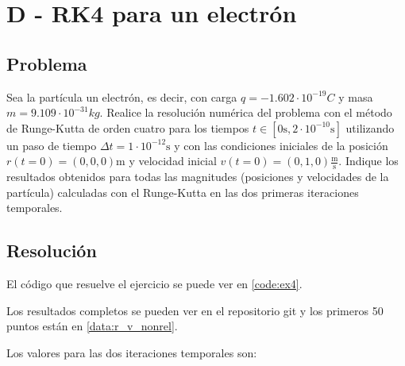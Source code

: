 \section{D - RK4 para un electrón}

\subsection{Problema}

Sea la partícula un electrón, es decir, con carga $q = -1.602 \cdot 10^{-19} C$  y masa $m = 9.109 \cdot 10^{-31} kg$. Realice la resolución numérica del problema con el método de Runge-Kutta de orden cuatro para los tiempos $t \in [0 \text{s}, 2\cdot10^{-10} \text{s} ]$ utilizando un paso de tiempo $\Delta t = 1 \cdot 10^{-12} \text{s}$ y con las condiciones iniciales de la posición $r(t = 0) = (0, 0, 0) \text{m}$ y velocidad inicial $v(t=0) = (0, 1, 0) \frac{\text{m}}{\text{s}}$.  Indique los resultados obtenidos para todas las magnitudes (posiciones y velocidades de la partícula) calculadas con el Runge-Kutta en las dos primeras iteraciones temporales.

\subsection{Resolución}

El código que resuelve el ejercicio se puede ver en \ref{code:ex4}.

Los resultados completos se pueden ver en el repositorio git y los primeros 50 puntos están en \ref{data:r_v_nonrel}. 

Los valores para las dos iteraciones temporales son:


\begin{table}[H]
	\centering
\end{table}

\begin{table}[H]
	\centering
\end{table}


